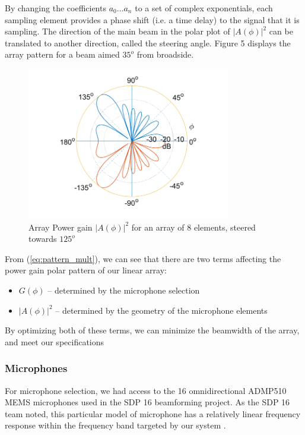 \documentclass[10pt,journal,compsoc]{IEEEtran}
\begin{document}
By changing the coefficients $a_0 \ldots a_n$  to a set of complex exponentials, each sampling element provides a phase shift (i.e. a time delay) to the signal that it is sampling.  The direction of the main beam in the polar plot of $|A(\phi)|^2$ can be translated to another direction, called the steering angle. Figure 5 displays the array pattern for a beam aimed $35^o$ from broadside.

\begin{figure}[!htb]
    \centering
    \includegraphics[width=3.5in]{steered}
    \caption{Array Power gain $|A(\phi)|^2$ for an array of 8 elements, steered towards $125^o$}
    \label{fig:steered_aliased}
\end{figure}

From (\ref{eq:pattern_mult}), we can see that there are two terms affecting the power gain polar pattern of our linear array:

\begin{itemize}
	\item $G(\phi)$ – determined by the microphone selection
	\item $|A(\phi)|^2$ – determined by the geometry of the microphone elements
\end{itemize}

By optimizing both of these terms, we can minimize the beamwidth of the array, and meet our specifications

\subsubsection{Microphones}

For microphone selection, we had access to the 16 omnidirectional ADMP510 MEMS microphones used in the SDP 16 beamforming project.  As the SDP 16 team noted, this particular model of microphone has a relatively linear frequency response within the frequency band targeted by our system \cite{sauron}.
\end{document}
